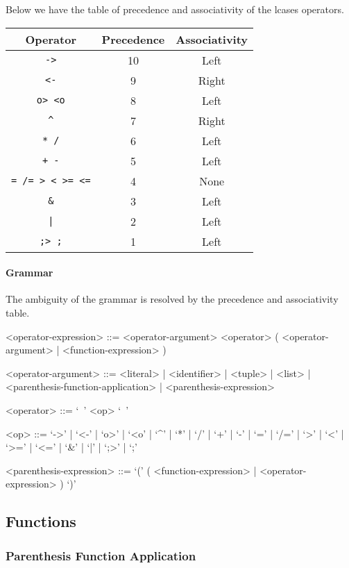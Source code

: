 \documentclass{article}
\begin{document}
Below we have the table of precedence and associativity of the lcases operators.
\begin{center}
\begin{tabular}{ |c|c|c| } 
\hline
Operator & Precedence & Associativity \\ 
\hline
\hline
\texttt{->} & 10 & Left \\
\hline
\texttt{<-} & 9 & Right \\
\hline
\texttt{o> <o} & 8 & Left \\
\hline
\texttt{\^} & 7 & Right \\
\hline
\texttt{* /} & 6 & Left \\
\hline
\texttt{+ -} & 5 & Left \\ 
\hline
\texttt{= /= > < >= <=} & 4 & None \\
\hline
\texttt{\&} & 3 & Left \\
\hline
\texttt{|} & 2 & Left \\
\hline
\texttt{;> ;} & 1 & Left \\
\hline
\end{tabular}
\end{center}

\paragraph{Grammar}
The ambiguity of the grammar is resolved by the precedence and associativity table.
\begin{grammar}
<operator-expression> ::=
<operator-argument> <operator> ( <operator-argument> | <function-expression> )

<operator-argument> ::=
<literal> | <identifier> | <tuple> | <list> | <parenthesis-function-application> |
<parenthesis-expression>

<operator> ::= `\ ' <op> `\ '

<op> ::= 
`->' | `<-' | `o>' | `<o' | `^' | `*' | `/' | `+' | `-' |
`=' | `/=' | `>' | `<' | `>=' | `<=' | `\&' | `|' | `;>' | `;'

<parenthesis-expression> ::=
`(' ( <function-expression> | <operator-expression> ) `)'
\end{grammar}

\subsection{Functions}
\subsubsection{Parenthesis Function Application}
\label{subsec:parenfuncapp}
\end{document}
